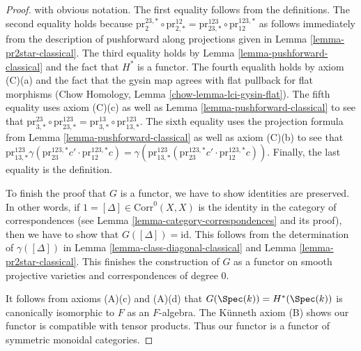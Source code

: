 \begin{proof}
with obvious notation. The first equality follows from the definitions.
The second equality holds because
$\text{pr}^{23, *}_2 \circ \text{pr}^{12}_{2, *} =
\text{pr}^{123}_{23, *} \circ \text{pr}^{123, *}_{12}$
as follows immediately from the description of pushforward
along projections given in Lemma \ref{lemma-pr2star-classical}.
The third equality holds by Lemma \ref{lemma-pushforward-classical}
and the fact that $H^*$ is a functor.
The fourth equalith holds by axiom (C)(a) and the fact that
the gysin map agrees with flat pullback for flat morphisms
(Chow Homology, Lemma \ref{chow-lemma-lci-gysin-flat}).
The fifth equality uses axiom (C)(c) as well as
Lemma \ref{lemma-pushforward-classical} to see that
$\text{pr}^{23}_{3, *} \circ \text{pr}^{123}_{23, *} =
\text{pr}^{13}_{3, *} \circ \text{pr}^{123}_{13, *}$.
The sixth equality uses the projection formula from
Lemma \ref{lemma-pushforward-classical} as well as
axiom (C)(b) to see that $
\text{pr}^{123}_{13, *}
\gamma(\text{pr}^{123, *}_{23}c' \cdot \text{pr}^{123, *}_{12}c) =
\gamma(\text{pr}^{123}_{13, *}(
\text{pr}^{123, *}_{23}c' \cdot \text{pr}^{123, *}_{12}c))$.
Finally, the last equality is the definition.

\medskip\noindent
To finish the proof that $G$ is a functor,
we have to show identities are preserved. In other words, if
$1 = [\Delta] \in \text{Corr}^0(X, X)$ is the identity
in the category of correspondences (see
Lemma \ref{lemma-category-correspondences} and its proof),
then we have to show that $G([\Delta]) = \text{id}$.
This follows from the determination of
$\gamma([\Delta])$ in Lemma \ref{lemma-class-diagonal-classical}
and Lemma \ref{lemma-pr2star-classical}.
This finishes the construction of $G$ as a functor on
smooth projective varieties and correspondences of degree $0$.

\medskip\noindent
It follows from axioms (A)(c) and (A)(d) that
$G(\Spec(k)) = H^*(\Spec(k))$ is canonically isomorphic to $F$
as an $F$-algebra.
The K\"unneth axiom (B) shows our functor is compatible with tensor products.
Thus our functor is a functor of symmetric monoidal categories.


\end{proof}
